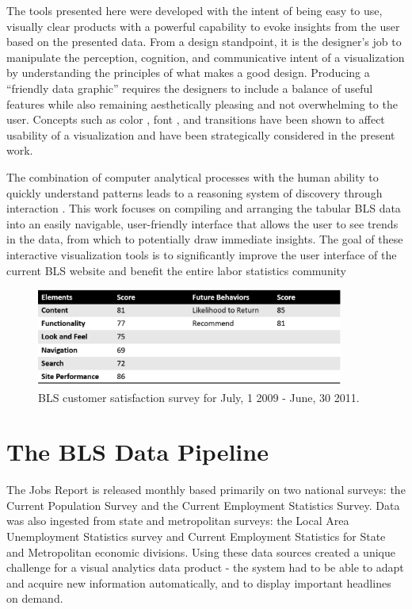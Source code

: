 \documentclass[11pt,letterpaper]{article}
\begin{document}
The tools presented here were developed with the intent of being easy to use, visually clear products with a powerful capability to evoke insights from the user based on the presented data. From a design standpoint, it is the designer's job to manipulate the perception, cognition, and communicative intent of a visualization \cite{agrawala2011design} by understanding the principles of what makes a good design. Producing a ``friendly data graphic'' \cite{tufte1983visual} requires the designers to include a balance of useful features while also remaining aesthetically pleasing and not overwhelming to the user. Concepts such as color \cite{macdonald1999using}, font \cite{moere2011role}, and transitions \cite{heer2007animated} have been shown to affect usability of a visualization and have been strategically considered in the present work.

The combination of computer analytical processes with the human ability to quickly understand patterns leads to a reasoning system of discovery through interaction \cite{green_visual_2008}. This work focuses on compiling and arranging the tabular BLS data into an easily navigable, user-friendly interface that allows the user to see trends in the data, from which to potentially draw immediate insights. The goal of these interactive visualization tools is to significantly improve the user interface of the current BLS website and benefit the entire labor statistics community

\begin{figure}[t]
	\centering
    \includegraphics[width=0.9\textwidth]{figures/BLSSurvey_ppt.png}
    \caption{BLS customer satisfaction survey for July, 1 2009 - June, 30 2011.}
    \label{CustSat}
\end{figure}

\section{The BLS Data Pipeline}

The Jobs Report is released monthly based primarily on two national surveys: the Current Population Survey and the Current Employment Statistics Survey. Data was also ingested from state and metropolitan surveys: the Local Area Unemployment Statistics survey and Current Employment Statistics for State and Metropolitan economic divisions. Using these data sources created a unique challenge for a visual analytics data product - the system had to be able to adapt and acquire new information automatically, and to display important headlines on demand.
\end{document}
